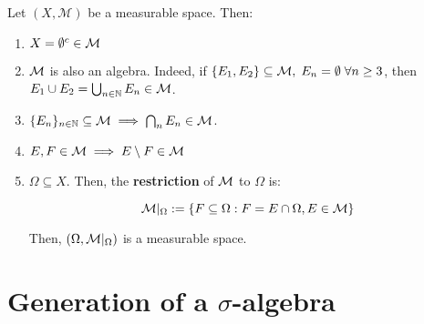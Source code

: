 \begin{fproperties}
    Let $(X, \mathcal{M})$ be a measurable space. Then:

    \vspace{1em}

    \begin{enumerate}[label=(\roman*)]
        \item $X = \emptyset^c \in \mathcal{M}$
        
        \vspace{0.5em}
    
        \item $\mathcal{M}$ is also an algebra. Indeed, if $\{E_1, E_2\} \subseteq \mathcal{M},\; E_n = \emptyset \; \forall n \geq 3$,
        then $E_1 \cup E_2 = \bigcup_{n \in \mathbb{N}} E_n \in \mathcal{M}$.

        \vspace{0.5em}

        \item $\{E_n\}_{n \in \mathbb{N}} \subseteq \mathcal{M} \implies \bigcap_{n} E_n \in \mathcal{M}$.
        
        \vspace{0.5em}

        \item $E, F \in \mathcal{M} \implies E\setminus F \in \mathcal{M}$
        
        \vspace{0.5em}

        \item $\Omega \subseteq X$. Then, the \textbf{restriction} of $\mathcal{M}$ to $\Omega$ is:
        
        $$\mathcal{M} |_{\Omega} := \{F \subseteq \Omega: F = E \cap \Omega, E \in \mathcal{M}\}$$

        Then, $(\Omega, \mathcal{M} |_{\Omega})$ is a measurable space.
    \end{enumerate}
\end{fproperties}

\section{Generation of a \texorpdfstring{$\sigma$}{sigma}-algebra}

